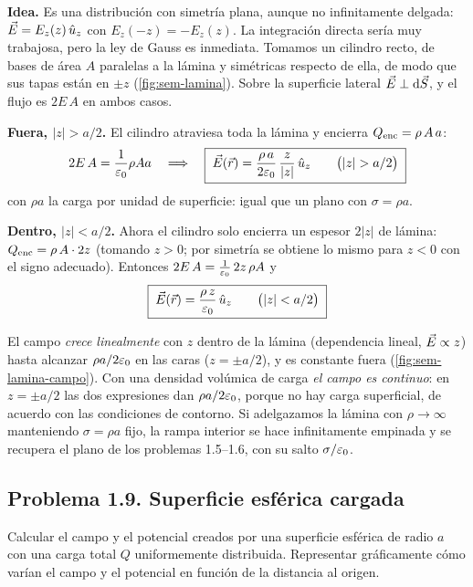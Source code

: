\begin{resolucion}
\textbf{Idea.} Es una distribución con simetría plana, aunque no infinitamente delgada: $\vec{E}=E_z(z)\,\hat{u}_{z}$ con $E_z(-z)=-E_z(z)$. La integración directa sería muy trabajosa, pero la ley de Gauss es inmediata. Tomamos un cilindro recto, de bases de área $A$ paralelas a la lámina y
simétricas respecto de ella, de modo que sus tapas están en $\pm z$ (\cref{fig:sem-lamina}). Sobre la superficie lateral $\vec{E}\perp\mathrm{d}\vec{S}$, y el flujo es $2E\,A$ en ambos casos.

\textbf{Fuera, $\lvert z\rvert>a/2$.} El cilindro atraviesa toda la lámina y encierra $Q_{\mathrm{enc}}=\rho\,A\,a$:
\[
  2E\,A=\frac{1}{\varepsilon_{0}}\rho A a\quad\Longrightarrow\quad\boxed{\;\vec{E}(\vec{r})=\frac{\rho\,a}{2\varepsilon_{0}}\,\frac{z}{\lvert z\rvert}\,\hat{u}_{z}\qquad\bigl(\lvert z\rvert>a/2\bigr)\;}
\]
con $\rho a$ la carga por unidad de superficie: igual que un plano con $\sigma=\rho a$.

\textbf{Dentro, $\lvert z\rvert<a/2$.} Ahora el cilindro solo encierra un espesor $2\lvert z\rvert$ de lámina: $Q_{\mathrm{enc}}=\rho\,A\cdot2z$ (tomando $z>0$; por simetría se obtiene lo mismo para $z<0$ con el signo adecuado). Entonces $2E\,A=\frac{1}{\varepsilon_{0}}\,2z\,\rho A$ y
\[
  \boxed{\;\vec{E}(\vec{r})=\frac{\rho\,z}{\varepsilon_{0}}\,\hat{u}_{z}\qquad\bigl(\lvert z\rvert<a/2\bigr)\;}
\]
\end{resolucion}

\begin{observacion}[Interpretación]
El campo \emph{crece linealmente} con $z$ dentro de la lámina (dependencia lineal, $\vec{E}\propto z$) hasta alcanzar $\rho a/2\varepsilon_{0}$ en las caras ($z=\pm a/2$), y es constante fuera (\cref{fig:sem-lamina-campo}). Con una densidad volúmica de carga \emph{el campo es continuo}: en $z=\pm a/2$ las dos expresiones dan $\rho a/2\varepsilon_{0}$,
porque no hay carga superficial, de acuerdo con las condiciones de contorno. Si adelgazamos la lámina con $\rho\to\infty$ manteniendo $\sigma=\rho a$ fijo, la rampa interior se hace infinitamente empinada y se recupera el plano de los problemas 1.5--1.6, con su salto $\sigma/\varepsilon_{0}$.
\end{observacion}





\subsection{Problema 1.9. Superficie esférica cargada}\label{sem:cascara}
\begin{ejercicio}\label{ejer:cascara}
Calcular el campo y el potencial creados por una superficie esférica de radio $a$ con una carga total $Q$ uniformemente distribuida. Representar gráficamente cómo varían el campo y el potencial en función de la distancia al origen.
\end{ejercicio}

